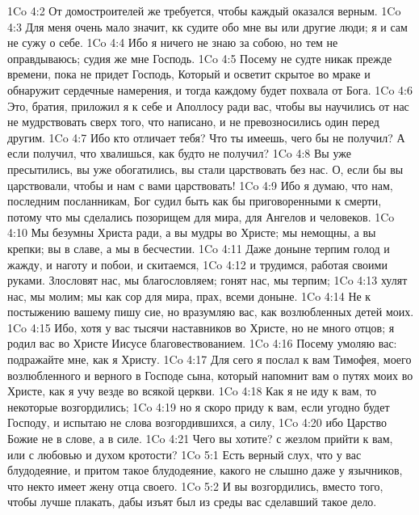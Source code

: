 \vs 1Co 4:2 От домостроителей же требуется, чтобы каждый оказался верным.
\vs 1Co 4:3 Для меня очень мало значит, кк судите обо мне вы или  другие люди; я и сам не сужу о себе.
\vs 1Co 4:4 Ибо  я ничего не знаю за собою, но тем не оправдываюсь; судия же мне Господь.
\vs 1Co 4:5 Посему не судте никак прежде времени, пока не придет Господь, Который и осветит скрытое во мраке и обнаружит сердечные намерения, и тогда каждому будет похвала от Бога.
\rsbpar\vs 1Co 4:6 Это, братия, приложил я к себе и Аполлосу ради вас, чтобы вы научились от нас не мудрствовать сверх того, что написано, и не превозносились один перед другим.
\vs 1Co 4:7 Ибо кто отличает тебя? Что ты имеешь, чего бы не получил? А если получил, что хвалишься, как будто не получил?
\vs 1Co 4:8 Вы уже пресытились, вы уже обогатились, вы стали царствовать без нас. О, если бы вы  царствовали, чтобы и нам с вами царствовать!
\vs 1Co 4:9 Ибо я думаю, что нам, последним посланникам, Бог судил быть как бы приговоренными к смерти, потому что мы сделались позорищем для мира, для Ангелов и человеков.
\vs 1Co 4:10 Мы безумны Христа ради, а вы мудры во Христе; мы немощны, а вы крепки; вы в славе, а мы в бесчестии.
\vs 1Co 4:11 Даже доныне терпим голод и жажду, и наготу и побои, и скитаемся,
\vs 1Co 4:12 и трудимся, работая своими руками. Злословят нас, мы благословляем; гонят нас, мы терпим;
\vs 1Co 4:13 хулят нас, мы молим; мы как сор для мира,  прах, всеми  доныне.
\rsbpar\vs 1Co 4:14 Не к постыжению вашему пишу сие, но вразумляю вас, как возлюбленных детей моих.
\vs 1Co 4:15 Ибо, хотя у вас тысячи наставников во Христе, но не много отцов; я родил вас во Христе Иисусе благовествованием.
\vs 1Co 4:16 Посему умоляю вас: подражайте мне, как я Христу.
\vs 1Co 4:17 Для сего я послал к вам Тимофея, моего возлюбленного и верного в Господе сына, который напомнит вам о путях моих во Христе, как я учу везде во всякой церкви.
\vs 1Co 4:18 Как я не иду к вам, то некоторые  возгордились;
\vs 1Co 4:19 но я скоро приду к вам, если угодно будет Господу, и испытаю не слова возгордившихся, а силу,
\vs 1Co 4:20 ибо Царство Божие не в слове, а в силе.
\vs 1Co 4:21 Чего вы хотите? с жезлом прийти к вам, или с любовью и духом кротости?
\vs 1Co 5:1 Есть верный слух, что у вас  блудодеяние, и притом такое блудодеяние, какого не слышно даже у язычников, что некто  имеет жену отца своего.
\vs 1Co 5:2 И вы возгордились, вместо того, чтобы лучше плакать, дабы изъят был из среды вас сделавший такое дело.
